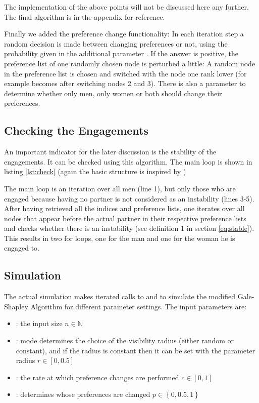 \documentclass[11pt]{article}
\begin{document}
The implementation of the above points will not be discussed here any further. The final algorithm is in the appendix for reference.

Finally we added the preference change functionality: In each iteration step a random decision is made between changing preferences or not,
using the probability given in the additional parameter . If the answer is positive, the preference list of one randomly chosen node
is perturbed a little: A random node in the preference list is chosen and switched with the node one rank lower (for example \mcode{[4,2,3,1]} 
becomes \mcode{[4,3,2,1]} after switching nodes 2 and 3). There is also a parameter to determine whether only men, only women or both should
change their preferences.

\subsection{Checking the Engagements} \label{check}

An important indicator for the later discussion is the stability of the engagements. It can be checked using this algorithm. The main loop is
shown in listing \ref{lst:check} (again the basic structure is inspired by \citet{rosetta})



The main loop is an iteration over all men (line 1), but only those who are engaged because having no partner is not considered as an instability
(lines 3-5). After having retrieved all the indices and preference lists, one iterates over all nodes that appear before the actual partner in their
respective preference lists and checks whether there is an instability (see definition 1 in section \ref{eq:stable}). This results in two for loops, one for the
man and one for the woman he is engaged to.

\subsection{Simulation} \label{sim}

The actual simulation makes iterated calls to  and  to simulate the modified Gale-Shapley Algorithm
for different parameter settings. The input parameters are:

\begin{itemize}
  \item {}: the input size $n\in\mathbb{N}$
  \item {}: mode determines the choice of the visibility radius (either random or constant), and if the radius is constant
  then it can be set with the parameter radius $r\in[0,0.5]$
  \item {}: the rate at which preference changes are performed $c\in[0,1]$
  \item {}: determines whose preferences are changed $p\in\left\{ {0, 0.5, 1}\right\}$
\end{itemize}
\end{document}
